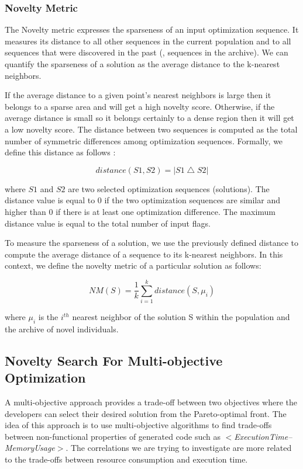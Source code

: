 \subsubsection{Novelty Metric}
The Novelty metric expresses the sparseness of an input optimization sequence. It measures its distance to all other sequences in the current population and to all sequences that were discovered in the past (\ie, sequences in the archive). 
We can quantify the sparseness of a solution as the average distance to the k-nearest neighbors. 

If the average distance to a given point's nearest neighbors is large then it belongs to a sparse area and will get a high novelty score. 
Otherwise, if the average distance is small so it belongs certainly to a dense region then it will get a low novelty score. 
The distance between two sequences is computed as the total number of symmetric differences among optimization sequences. Formally, we define this distance as follows :

\begin{equation}
distance(S1,S2)=\left | S1 \bigtriangleup S2 \right |
\end{equation}

where $S1$ and $S2$ are two selected optimization sequences (solutions). The distance value is equal to 0 if the two optimization sequences are similar and higher than 0 if there is at least one optimization difference. The maximum distance value is equal to the total number of input flags.

To measure the sparseness of a solution, we use the previously defined distance to compute the average distance of a sequence to its k-nearest neighbors. In this context, we define the novelty metric of a particular solution as follows:

\begin{equation}
NM(S) = \frac{1}{k} \sum_{i=1}^{k} distance(S,\mu _{i})
\end{equation}

where $\mu _{i}$ is the $i^{th}$ nearest neighbor of the solution S within the population and the archive of novel individuals. 

\subsection{Novelty Search For Multi-objective Optimization}
A multi-objective approach provides a trade-off between two objectives where the developers can select their desired solution from the Pareto-optimal front. The idea of this approach is to use multi-objective algorithms to find trade-offs between non-functional properties of generated code such as \textit{$<$ExecutionTime--MemoryUsage$>$}. The correlations we are trying to investigate are more related to the trade-offs between resource consumption and execution time.

